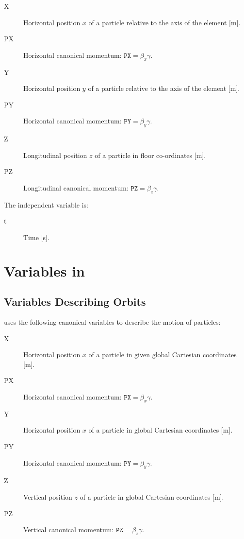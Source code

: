 \begin{description}
\item[X]
  Horizontal position $x$ of a particle relative to the axis of the element [m].

\item[PX]
  Horizontal canonical momentum:
  $\mathtt{PX} = \beta_x \gamma$.

\item[Y]
  Horizontal position $y$ of a particle relative to the axis of the element [m].

\item[PY]
  Horizontal canonical momentum:
  $\mathtt{PY} = \beta_y \gamma$.

\item[Z]
  Longitudinal position $z$ of a particle in floor co-ordinates [m].

\item[PZ]
 Longitudinal canonical momentum: 
 $\mathtt{PZ} = \beta_z \gamma$.

 \end{description}

The independent variable is:
\begin{description}
\item[t]
  Time [s].
\end{description}

\section{Variables in \opalcycl}
\label{sec:variablesopalcycl}

\subsection{Variables Describing Orbits}
\label{sec:opalcycl:canon}

\opalcycl uses the following canonical variables to describe the motion of particles:

\begin{description}
\item[X]
  Horizontal position $x$ of a particle in given global Cartesian coordinates [m].

\item[PX]
  Horizontal canonical momentum:
  $\mathtt{PX} = \beta_x \gamma$.

\item[Y]
  Horizontal position $x$ of a particle in global Cartesian coordinates [m].

\item[PY]
  Horizontal canonical momentum:
  $\mathtt{PY} = \beta_y \gamma$.

\item[Z]
  Vertical position $z$ of a particle in global Cartesian coordinates [m].

\item[PZ]
  Vertical canonical momentum:
  $\mathtt{PZ} = \beta_z \gamma$.

\end{description}

